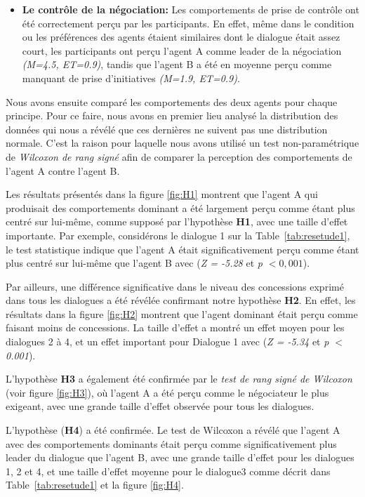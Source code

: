 {\begin{itemize}
							\item  \textbf{Le contrôle de la négociation:} Les comportements de prise de contrôle ont été correctement perçu par les participants. En effet, même dans le condition ou les préférences des agents étaient similaires dont le dialogue était assez court, les participants ont perçu l'agent A comme leader de la négociation \textit{(M=4.5, ET=0.9)}, tandis que l'agent B a été en moyenne perçu comme manquant de prise d'initiatives \textit{(M=1.9, ET=0.9)}.
					\end{itemize}
				
			Nous avons ensuite comparé les comportements des deux agents pour chaque principe. Pour ce faire, nous avons en premier lieu analysé la distribution des données qui nous a révélé que ces dernières ne suivent pas une distribution normale. C'est la raison pour laquelle nous avons utilisé un test non-paramétrique de \emph{Wilcoxon  de rang signé} afin de comparer la perception des comportements de l'agent A contre l'agent B.
			
			Les résultats présentés dans la figure \ref{fig:H1} montrent que l'agent A qui produisait des comportements dominant a été largement perçu comme étant plus centré sur lui-même, comme supposé par l'hypothèse \textbf {H1}, avec une taille d'effet importante. Par exemple, considérons le dialogue 1 sur la Table~\ref {tab:resetude1}, le test statistique indique que l'agent A était significativement perçu comme étant plus centré sur lui-même que l'agent B avec (\emph {Z = -5.28} et  \emph {p $ <0,001 $}).
			
			Par ailleurs, une différence significative dans le niveau des concessions exprimé dans tous les dialogues a été révélée confirmant notre hypothèse \textbf {H2}. En effet, les résultats dans la figure \ref{fig:H2} montrent que l'agent dominant était perçu comme faisant moins de concessions. La taille d'effet a montré un effet moyen pour les dialogues 2 à 4, et un effet important pour Dialogue 1 avec (\emph {Z = -5.34} et \emph {p $ <$ 0.001}).
			
			L'hypothèse \textbf {H3} a également été confirmée par le \emph {test de rang signé de Wilcoxon} (voir figure \ref{fig:H3}), où l'agent A a été perçu comme le négociateur le plus exigeant, avec une grande taille d'effet observée pour tous les dialogues. 
			
			L'hypothèse (\textbf {H4}) a été confirmée. Le test de Wilcoxon a révélé que l'agent A avec des comportements dominants  était perçu comme significativement plus leader du dialogue que l'agent B, avec une grande taille d'effet pour les dialogues 1, 2 et 4, et une taille d'effet moyenne pour le dialogue3 comme décrit dans Table~\ref {tab:resetude1} et la figure \ref{fig:H4}.

}
